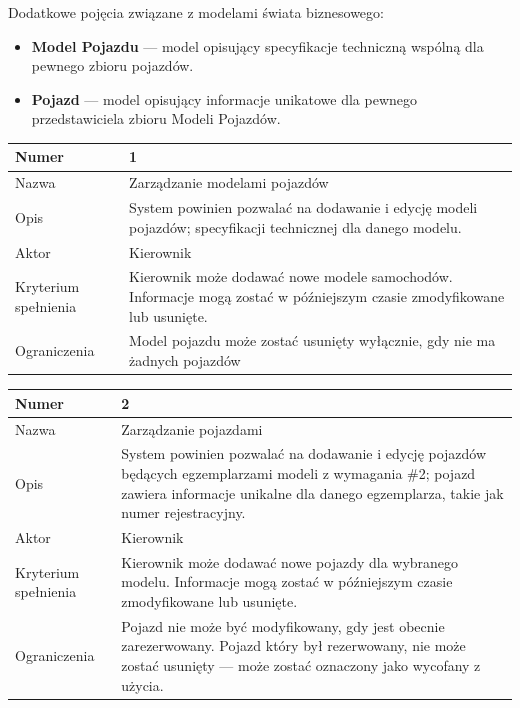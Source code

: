 \documentclass[eng,printmode,openany]{mgr}
\begin{document}
	Dodatkowe pojęcia związane z modelami świata biznesowego:
	\begin{itemize}
		\item \textbf{Model Pojazdu} — model opisujący specyfikacje techniczną wspólną dla pewnego zbioru pojazdów.
		\item \textbf{Pojazd} — model opisujący informacje unikatowe dla pewnego przedstawiciela zbioru Modeli Pojazdów.
	\end{itemize}
	
	\begin{table}[H]
		\begin{tabularx}{\textwidth}{|l|X|}
			\hline
			Numer                & 1  \\ \hline
			Nazwa                & Zarządzanie modelami pojazdów \\ \hline
			Opis                 & System powinien pozwalać na dodawanie i edycję modeli pojazdów; specyfikacji technicznej dla danego modelu.    \\ \hline
			Aktor                & Kierownik \\ \hline
			Kryterium spełnienia & Kierownik może dodawać nowe modele samochodów. Informacje mogą zostać w późniejszym czasie zmodyfikowane lub usunięte.\\ \hline
			Ograniczenia         & Model pojazdu może zostać usunięty wyłącznie, gdy nie ma żadnych pojazdów \\ \hline
		\end{tabularx}
	\end{table}
	
	\begin{table}[H]
		\begin{tabularx}{\textwidth}{|l|X|}
			\hline
			Numer                & 2 \\ \hline
			Nazwa                & Zarządzanie pojazdami \\ \hline
			Opis                 & System powinien pozwalać na dodawanie i edycję pojazdów będących egzemplarzami modeli z wymagania \#2; pojazd zawiera informacje unikalne dla danego egzemplarza, takie jak numer rejestracyjny.     \\ \hline
			Aktor                & Kierownik \\ \hline
			Kryterium spełnienia & Kierownik może dodawać nowe pojazdy dla wybranego modelu. Informacje mogą zostać w późniejszym czasie zmodyfikowane lub usunięte.\\ \hline
			Ograniczenia         & Pojazd nie może być modyfikowany, gdy jest obecnie zarezerwowany. Pojazd który był rezerwowany, nie może zostać usunięty — może zostać oznaczony jako wycofany z użycia. \\ \hline
		\end{tabularx}
	\end{table}
	
\end{document}

